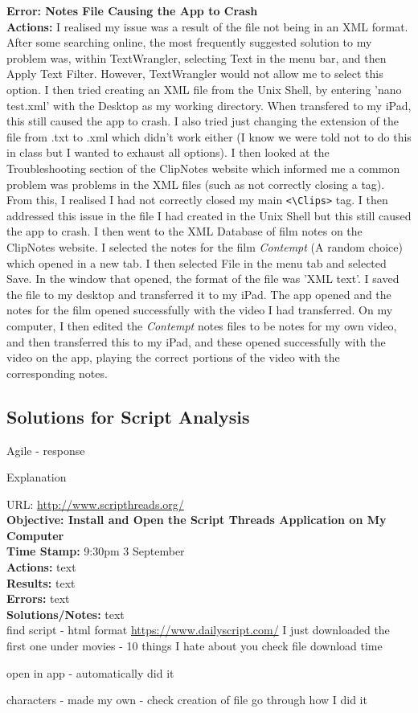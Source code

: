 \documentclass{article}
\begin{document}
\textbf{Error: Notes File Causing the App to Crash}\\
\textbf{Actions:} I realised my issue was a result of the file not being in an XML format. After some searching online, the most frequently suggested solution to my problem was, within TextWrangler, selecting Text in the menu bar, and then Apply Text Filter. However, TextWrangler would not allow me to select this option. I then tried creating an XML file from the Unix Shell, by entering 'nano test.xml' with the Desktop as my working directory. When transfered to my iPad, this still caused the app to crash. I also tried just changing the extension of the file from .txt to .xml which didn't work either (I know we were told not to do this in class but I wanted to exhaust all options). I then looked at the Troubleshooting section of the ClipNotes website which informed me a common problem was problems in the XML files (such as not correctly closing a tag). From this, I realised I had not correctly closed my main \verb|<\Clips>| tag. I then addressed this issue in the file I had created in the Unix Shell but this still caused the app to crash. I then went to the XML Database of film notes on the ClipNotes website. I selected the notes for the film \textit{Contempt} (A random choice) which opened in a new tab. I then selected File in the menu tab and selected Save. In the window that opened, the format of the file was 'XML text'. I saved the file to my desktop and transferred it to my iPad. The app opened and the notes for the film opened successfully with the video I had transferred. On my computer, I then edited the \textit{Contempt} notes files to be notes for my own video, and then transferred this to my iPad, and these opened successfully with the video on the app, playing the correct portions of the video with the corresponding notes.

\subsection{Solutions for Script Analysis}

Agile - response

Explanation

URL: \url{http://www.scripthreads.org/}\\

\textbf{Objective: Install and Open the Script Threads Application on My Computer}\\
\textbf{Time Stamp:} 9:30pm 3 September\\
\textbf{Actions:} text\\
\textbf{Results:} text\\
\textbf{Errors:} text\\
\textbf{Solutions/Notes:} text\\

find script - html format 
\url{https://www.dailyscript.com/}
I just downloaded the first one under movies - 10 things I hate about you
check file download time

open in app - automatically did it

characters - made my own - check creation of file
go through how I did it
\end{document}
